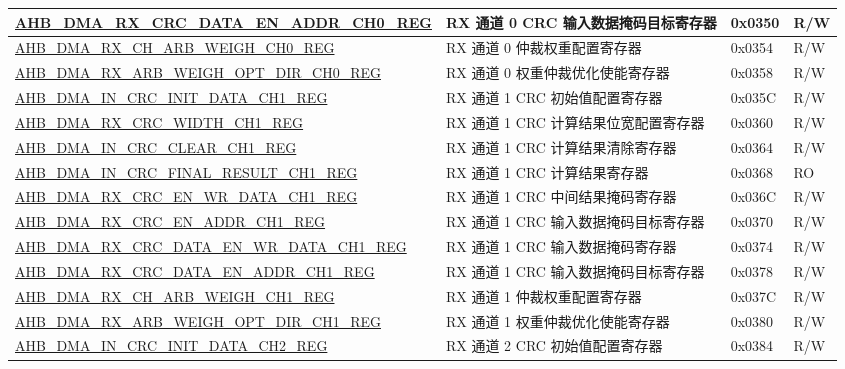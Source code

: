 \begin{longtable}{ | l | l | p{1.3cm} | l | }
\hyperref[regdesc:AHBDMARXCRCDATAENADDRCHNREG]{AHB\_DMA\_RX\_CRC\_DATA\_EN\_ADDR\_CH0\_REG} & RX 通道 0 CRC 输入数据掩码目标寄存器 & 0x0350 & R/W \\ \hline
\hyperref[regdesc:AHBDMARXCHARBWEIGHCHNREG]{AHB\_DMA\_RX\_CH\_ARB\_WEIGH\_CH0\_REG} & RX 通道 0 仲裁权重配置寄存器 & 0x0354 & R/W \\ \hline
\hyperref[regdesc:AHBDMARXARBWEIGHOPTDIRCHNREG]{AHB\_DMA\_RX\_ARB\_WEIGH\_OPT\_DIR\_CH0\_REG} & RX 通道 0 权重仲裁优化使能寄存器 & 0x0358 & R/W \\ \hline
\hyperref[regdesc:AHBDMAINCRCINITDATACHNREG]{AHB\_DMA\_IN\_CRC\_INIT\_DATA\_CH1\_REG} & RX 通道 1 CRC 初始值配置寄存器 & 0x035C & R/W \\ \hline
\hyperref[regdesc:AHBDMARXCRCWIDTHCHNREG]{AHB\_DMA\_RX\_CRC\_WIDTH\_CH1\_REG} & RX 通道 1 CRC 计算结果位宽配置寄存器 & 0x0360 & R/W \\ \hline
\hyperref[regdesc:AHBDMAINCRCCLEARCHNREG]{AHB\_DMA\_IN\_CRC\_CLEAR\_CH1\_REG} & RX 通道 1 CRC 计算结果清除寄存器 & 0x0364 & R/W \\ \hline
\hyperref[regdesc:AHBDMAINCRCFINALRESULTCHNREG]{AHB\_DMA\_IN\_CRC\_FINAL\_RESULT\_CH1\_REG} & RX 通道 1 CRC 计算结果寄存器 & 0x0368 & RO \\ \hline
\hyperref[regdesc:AHBDMARXCRCENWRDATACHNREG]{AHB\_DMA\_RX\_CRC\_EN\_WR\_DATA\_CH1\_REG} & RX 通道 1 CRC 中间结果掩码寄存器 & 0x036C & R/W \\ \hline
\hyperref[regdesc:AHBDMARXCRCENADDRCHNREG]{AHB\_DMA\_RX\_CRC\_EN\_ADDR\_CH1\_REG} & RX 通道 1 CRC 输入数据掩码目标寄存器 & 0x0370 & R/W \\ \hline
\hyperref[regdesc:AHBDMARXCRCDATAENWRDATACHNREG]{AHB\_DMA\_RX\_CRC\_DATA\_EN\_WR\_DATA\_CH1\_REG} & RX 通道 1 CRC 输入数据掩码寄存器 & 0x0374 & R/W \\ \hline
\hyperref[regdesc:AHBDMARXCRCDATAENADDRCHNREG]{AHB\_DMA\_RX\_CRC\_DATA\_EN\_ADDR\_CH1\_REG} & RX 通道 1 CRC 输入数据掩码目标寄存器 & 0x0378 & R/W \\ \hline
\hyperref[regdesc:AHBDMARXCHARBWEIGHCHNREG]{AHB\_DMA\_RX\_CH\_ARB\_WEIGH\_CH1\_REG} & RX 通道 1 仲裁权重配置寄存器 & 0x037C & R/W \\ \hline
\hyperref[regdesc:AHBDMARXARBWEIGHOPTDIRCHNREG]{AHB\_DMA\_RX\_ARB\_WEIGH\_OPT\_DIR\_CH1\_REG} & RX 通道 1 权重仲裁优化使能寄存器 & 0x0380 & R/W \\ \hline
\hyperref[regdesc:AHBDMAINCRCINITDATACHNREG]{AHB\_DMA\_IN\_CRC\_INIT\_DATA\_CH2\_REG} & RX 通道 2 CRC 初始值配置寄存器 & 0x0384 & R/W \\ \hline

\end{longtable}
